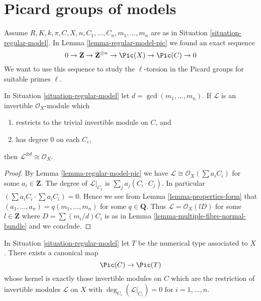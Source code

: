 \section{Picard groups of models}
\label{section-picard-groups-models}

\noindent
Assume $R, K, k, \pi, C, X, n, C_1, \ldots, C_n, m_1, \ldots, m_n$
are as in Situation \ref{situation-regular-model}.
In Lemma \ref{lemma-regular-model-pic} we found an exact sequence
$$
0 \to \mathbf{Z} \to \mathbf{Z}^{\oplus n} \to
\Pic(X) \to \Pic(C) \to 0
$$
We want to use this sequence to study the $\ell$-torsion in the
Picard groups for suitable primes $\ell$.

\begin{lemma}
\label{lemma-characterize-trivial}
In Situation \ref{situation-regular-model} let $d = \gcd(m_1, \ldots, m_n)$.
If $\mathcal{L}$ is an invertible $\mathcal{O}_X$-module which
\begin{enumerate}
\item restricts to the trivial invertible module on $C$, and
\item has degree $0$ on each $C_i$,
\end{enumerate}
then $\mathcal{L}^{\otimes d} \cong \mathcal{O}_X$.
\end{lemma}

\begin{proof}
By Lemma \ref{lemma-regular-model-pic} we have
$\mathcal{L} \cong \mathcal{O}_X(\sum a_i C_i)$ for some
$a_i \in \mathbf{Z}$. The degree of $\mathcal{L}|_{C_j}$
is $\sum_j a_j(C_i \cdot C_j)$. In particular
$(\sum a_i C_i \cdot \sum a_i C_i) = 0$.
Hence we see from Lemma \ref{lemma-properties-form}
that $(a_1, \ldots, a_n) = q(m_1, \ldots, m_n)$ for some
$q \in \mathbf{Q}$. Thus $\mathcal{L} = \mathcal{O}_X(lD)$
for some $l \in \mathbf{Z}$ where $D = \sum (m_i/d) C_i$ is as in
Lemma \ref{lemma-multiple-fibre-normal-bundle}
and we conclude.
\end{proof}

\begin{lemma}
\label{lemma-canonical-map-of-pic}
In Situation \ref{situation-regular-model}
let $T$ be the numerical type associated to $X$.
There exists a canonical map
$$
\Pic(C) \to \Pic(T)
$$
whose kernel is exactly those invertible modules on $C$
which are the restriction of invertible modules $\mathcal{L}$
on $X$ with $\deg_{C_i}(\mathcal{L}|_{C_i}) = 0$ for
$i = 1, \ldots, n$.
\end{lemma}

